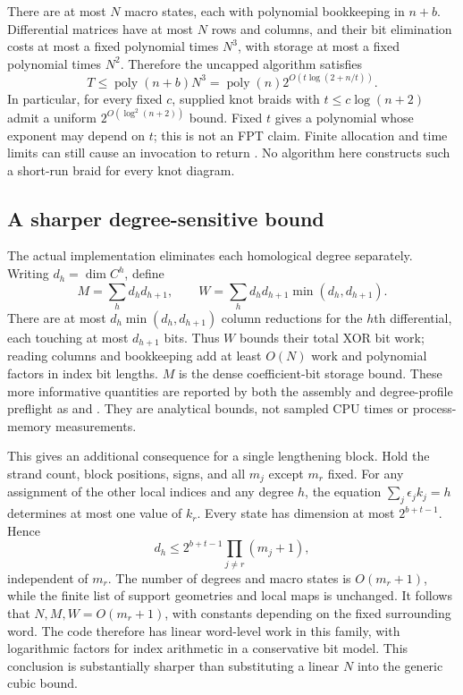 There are at most $N$ macro states, each with polynomial bookkeeping
in $n+b$. Differential matrices have at most $N$ rows and columns,
and their bit elimination costs at most a fixed polynomial times
$N^3$, with storage at most a fixed polynomial times $N^2$. Therefore
the uncapped algorithm satisfies
\[
 T\le\operatorname{poly}(n+b)N^3
   =\operatorname{poly}(n)2^{O(t\log(2+n/t))}.
\]
In particular, for every fixed $c$, supplied knot braids with
$t\le c\log(n+2)$ admit a uniform $2^{O(\log^2(n+2))}$ bound.
Fixed $t$ gives a polynomial whose exponent may depend on $t$; this
is not an FPT claim. Finite allocation and time limits can still cause
an invocation to return . No algorithm here constructs
such a short-run braid for every knot diagram.

\subsection{A sharper degree-sensitive bound}
The actual implementation eliminates each homological degree separately.
Writing $d_h=\dim C^h$, define
\[
 M=\sum_h d_hd_{h+1},\qquad
 W=\sum_h d_hd_{h+1}\min(d_h,d_{h+1}).
\]
There are at most $d_h\min(d_h,d_{h+1})$ column reductions for the
$h$th differential, each touching at most $d_{h+1}$ bits. Thus $W$
bounds their total XOR bit work; reading columns and bookkeeping add
at least $O(N)$ work and polynomial factors in index bit lengths.
$M$ is the dense coefficient-bit storage bound. These more informative
quantities are reported by both the assembly and degree-profile
preflight as  and
. They are analytical bounds,
not sampled CPU times or process-memory measurements.

This gives an additional consequence for a single lengthening block.
Hold the strand count, block positions, signs, and all $m_j$ except
$m_r$ fixed. For any assignment of the other local indices and any
degree $h$, the equation $\sum_j\epsilon_jk_j=h$ determines at most
one value of $k_r$. Every state has dimension at most $2^{b+t-1}$.
Hence
\[
 d_h\le 2^{b+t-1}\prod_{j\ne r}(m_j+1),
\]
independent of $m_r$. The number of degrees and macro states is
$O(m_r+1)$, while the finite list of support geometries and local maps
is unchanged. It follows that $N,M,W=O(m_r+1)$, with constants depending
on the fixed surrounding word. The code therefore has linear word-level
work in this family, with logarithmic factors for index arithmetic in
a conservative bit model. This conclusion is substantially sharper
than substituting a linear $N$ into the generic cubic bound.

